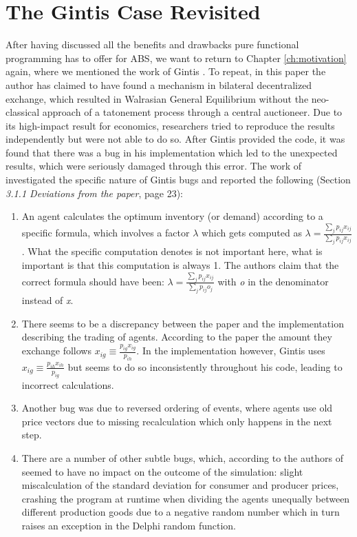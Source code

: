 \section{The Gintis Case Revisited}
\label{sec:gintis_case} 
After having discussed all the benefits and drawbacks pure functional programming has to offer for ABS, we want to return to Chapter \ref{ch:motivation} again, where we mentioned the work of Gintis \cite{gintis_emergence_2006}. To repeat, in this paper the author has claimed to have found a mechanism in bilateral decentralized exchange, which resulted in Walrasian General Equilibrium without the neo-classical approach of a tatonement process through a central auctioneer. Due to its high-impact result for economics, researchers \cite{ionescu_dependently-typed_2012} tried to reproduce the results independently but were not able to do so. After Gintis provided the code, it was found that there was a bug in his implementation which led to the unexpected results, which were seriously damaged through this error. The work of \cite{evensen_extensible_2010} investigated the specific nature of Gintis bugs and reported the following (Section \textit{3.1.1  Deviations from the paper}, page 23):

\begin{enumerate}
	\item An agent calculates the optimum inventory (or demand) according to a specific formula, which involves a factor $\lambda$ which gets computed as $\lambda = \frac{\sum_{j}{} p_{ij}x_{ij}}{\sum_{j}{} p_{ij}x_{ij}}$. What the specific computation denotes is not important here, what is important is that this computation is always 1. The authors \cite{evensen_extensible_2010} claim that the correct formula should have been: $\lambda = \frac{\sum_{j}{} p_{ij}x_{ij}}{\sum_{j}{} p_{ij}o_{j}}$ with \textit{o} in the denominator instead of \textit{x}. 
	
	\item There seems to be a discrepancy between the paper and the implementation describing the trading of agents. According to the paper the amount they exchange follows $x_{ig} \equiv \frac{p_{ig}x_{ig}}{p_{ih}}$. In the implementation however, Gintis uses $x_{ig} \equiv \frac{p_{ih}x_{ih}}{p_{ig}}$ but seems to do so inconsistently throughout his code, leading to incorrect calculations.
	
	\item Another bug was due to reversed ordering of events, where agents use old price vectors due to missing recalculation which only happens in the next step.

	\item There are a number of other subtle bugs, which, according to the authors of \cite{evensen_extensible_2010} seemed to have no impact on the outcome of the simulation: slight miscalculation of the standard deviation for consumer and producer prices, crashing the program at runtime when dividing the agents unequally between different production goods due to a negative random number which in turn raises an exception in the Delphi random function.
\end{enumerate}

